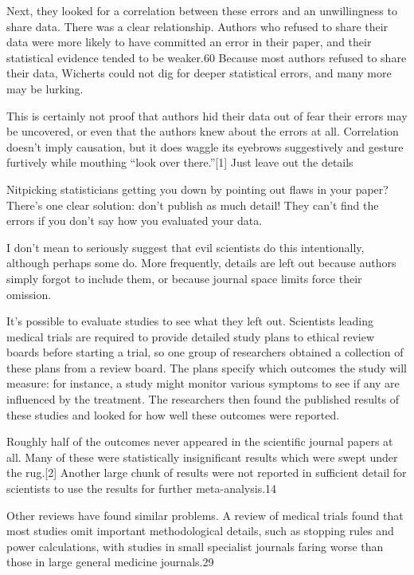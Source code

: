 Next, they looked for a correlation between these errors and an unwillingness to share data. There was a clear relationship. Authors who refused to share their data were more likely to have committed an error in their paper, and their statistical evidence tended to be weaker.60 Because most authors refused to share their data, Wicherts could not dig for deeper statistical errors, and many more may be lurking.

This is certainly not proof that authors hid their data out of fear their errors may be uncovered, or even that the authors knew about the errors at all. Correlation doesn’t imply causation, but it does waggle its eyebrows suggestively and gesture furtively while mouthing “look over there.”[1]
Just leave out the details

Nitpicking statisticians getting you down by pointing out flaws in your paper? There’s one clear solution: don’t publish as much detail! They can’t find the errors if you don’t say how you evaluated your data.

I don’t mean to seriously suggest that evil scientists do this intentionally, although perhaps some do. More frequently, details are left out because authors simply forgot to include them, or because journal space limits force their omission.

It’s possible to evaluate studies to see what they left out. Scientists leading medical trials are required to provide detailed study plans to ethical review boards before starting a trial, so one group of researchers obtained a collection of these plans from a review board. The plans specify which outcomes the study will measure: for instance, a study might monitor various symptoms to see if any are influenced by the treatment. The researchers then found the published results of these studies and looked for how well these outcomes were reported.

Roughly half of the outcomes never appeared in the scientific journal papers at all. Many of these were statistically insignificant results which were swept under the rug.[2] Another large chunk of results were not reported in sufficient detail for scientists to use the results for further meta-analysis.14

Other reviews have found similar problems. A review of medical trials found that most studies omit important methodological details, such as stopping rules and power calculations, with studies in small specialist journals faring worse than those in large general medicine journals.29

